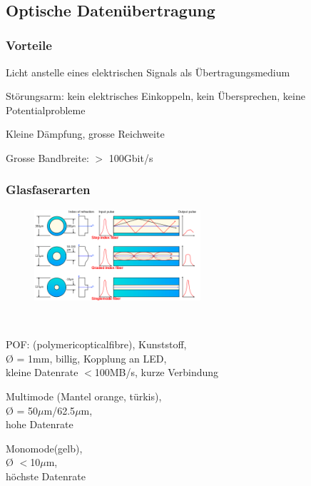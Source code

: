 \ \\
\subsection{Optische Datenübertragung}
\subsubsection{Vorteile}
\begin{compactitem}
    \item Licht anstelle eines elektrischen Signals als Übertragungsmedium
    \item Störungsarm: kein elektrisches Einkoppeln, kein Übersprechen, keine Potentialprobleme
    \item Kleine Dämpfung, grosse Reichweite
    \item Grosse Bandbreite: $>$ 100Gbit/s
\end{compactitem}

\subsubsection{Glasfaserarten}
\begin{figure}
    \centering
    \includegraphics[width=0.55\textwidth]{images/glasfaserarten}
\end{figure}
\ 
\vspace{-5pt}
\begin{compactitem}
    \item POF: (polymericopticalfibre), Kunststoff, \\
    Ø = 1mm, billig, Kopplung an LED, \\
    kleine Datenrate $<$100MB/s, kurze Verbindung
    \item Multimode (Mantel orange, türkis), \\
    Ø = 50$\mu$m/62.5$\mu$m, \\
    hohe Datenrate
    \item Monomode(gelb), \\
    Ø $<$10$\mu$m, \\
    höchste Datenrate
\end{compactitem}
\ \\

